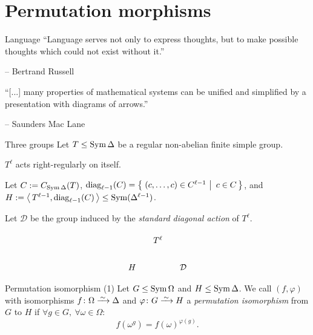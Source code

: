 \documentclass{beamer}
\theoremstyle{plain}
\theoremstyle{definition}
\begin{document}
\section{Permutation morphisms}
\begin{frame}{Language}
``Language serves not only to express thoughts, but to make possible thoughts
which could not exist without it.''

\hfill --
Bertrand Russell
\hspace{2em}

\vspace{2em}

``[...] many properties of mathematical systems can be unified and simplified
by a presentation with diagrams of arrows.''

\hfill --
Saunders Mac Lane
\hspace{2em}
\end{frame}

\begin{frame}{Three groups}
Let $T \leq \operatorname{Sym} \Delta$ be a regular non-abelian finite simple group.

$T ^ \ell$ acts right-regularly on itself.

Let $C := C_{\operatorname{Sym} \Delta}(T)$,
$\operatorname{diag}_{\ell - 1}(C) =  \left\{ \left.\, (c, \ldots, c) \in C ^ {\ell - 1} ~\right|~  c \in C  \,\right\} $,
and
$H :=  \left\langle \,  T ^ {\ell - 1}, \operatorname{diag}_{\ell - 1}(C)  \, \right\rangle  \leq
\operatorname{Sym}(\Delta ^ {\ell - 1})$.

Let $\mathcal D$ be the group induced by the \emph{standard diagonal action} of $T ^ \ell$.

\pause
\[
\begin{tikzcd}[column sep=small, ampersand replacement=\&]
    \&
    T ^ \ell
    \&
    \\
    H
    \&
    \&
    \mathcal D
\end{tikzcd}
\]
\end{frame}


\begin{frame}{Permutation isomorphism (1)}
Let $G \leq \operatorname{Sym} \Omega$ and $H \leq \operatorname{Sym} \Delta$.
We call $(f, \varphi)$ with
isomorphisms
$f \from \Omega \iso \Delta$
and
$\varphi \from G \iso H$
a \emph{permutation isomorphism}
from $G$ to $H$
if
$\forall g \in G, ~ \forall \omega \in \Omega :$
\[
    f(\omega ^ g) = f(\omega) ^ {\varphi(g)}.
\]
\end{frame}
\end{document}
